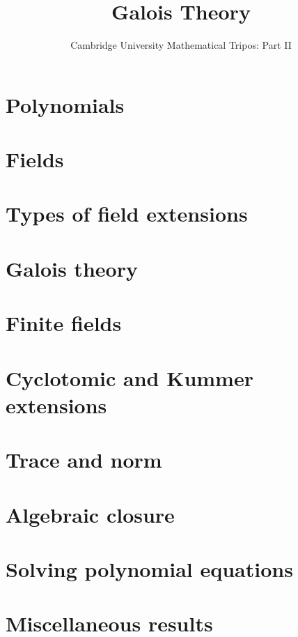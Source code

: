 \documentclass{article}
\title{Galois Theory}
\author{Cambridge University Mathematical Tripos: Part II}
\begin{document}
\maketitle

\tableofcontentsnewpage{}

\section{Polynomials}

\section{Fields}

\section{Types of field extensions}

\section{Galois theory}

\section{Finite fields}

\section{Cyclotomic and Kummer extensions}

\section{Trace and norm}

\section{Algebraic closure}

\section{Solving polynomial equations}

\section{Miscellaneous results}

\end{document}
